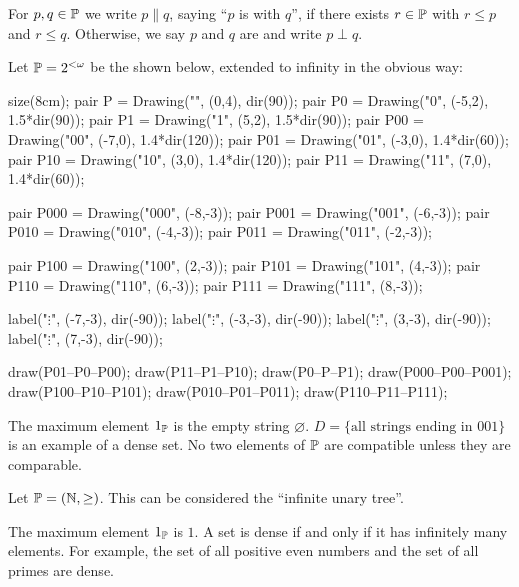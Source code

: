 \begin{definition}
	For $p,q \in \mathbb P$ we write $p \parallel q$,
	saying ``$p$ is  with $q$'',
	if there exists $r \in \mathbb P$ with $r \le p$ and $r \le q$.
	Otherwise, we say $p$ and $q$ are 
	and write $p \perp q$.
\end{definition}
\begin{example}
	Let $\mathbb P = 2^{<\omega}$ be the  shown below,
	extended to infinity in the obvious way:
	\begin{center}
		\begin{asy}
			size(8cm);
			pair P = Drawing("\varnothing", (0,4), dir(90));
			pair P0 = Drawing("0", (-5,2), 1.5*dir(90));
			pair P1 = Drawing("1", (5,2),  1.5*dir(90));
			pair P00 = Drawing("00", (-7,0), 1.4*dir(120));
			pair P01 = Drawing("01", (-3,0), 1.4*dir(60));
			pair P10 = Drawing("10", (3,0),  1.4*dir(120));
			pair P11 = Drawing("11", (7,0),  1.4*dir(60));

			pair P000 = Drawing("000", (-8,-3));
			pair P001 = Drawing("001", (-6,-3));
			pair P010 = Drawing("010", (-4,-3));
			pair P011 = Drawing("011", (-2,-3));

			pair P100 = Drawing("100", (2,-3));
			pair P101 = Drawing("101", (4,-3));
			pair P110 = Drawing("110", (6,-3));
			pair P111 = Drawing("111", (8,-3));

			label("$\vdots$", (-7,-3), dir(-90));
			label("$\vdots$", (-3,-3), dir(-90));
			label("$\vdots$", (3,-3), dir(-90));
			label("$\vdots$", (7,-3), dir(-90));

			draw(P01--P0--P00);
			draw(P11--P1--P10);
			draw(P0--P--P1);
			draw(P000--P00--P001);
			draw(P100--P10--P101);
			draw(P010--P01--P011);
			draw(P110--P11--P111);
		\end{asy}
	\end{center}

	\begin{enumerate}[(a)]
		\ii The maximum element $1_\mathbb P$ is the empty string $\varnothing$.
		\ii $D = \{\text{all strings ending in $001$}\}$ is an example of a dense set.
		\ii No two elements of $\mathbb P$ are compatible unless they are comparable.
	\end{enumerate}
\end{example}

\begin{example}
	Let $\mathbb P = (\mathbb N, \geq)$. This can be considered the ``infinite unary tree''.
	\begin{itemize}
		\ii The maximum element $1_\mathbb P$ is $1$.
		\ii A set is dense if and only if it has infinitely many elements. For example, the set of
		all positive even numbers and the set of all primes are dense.
	\end{itemize}
\end{example}

